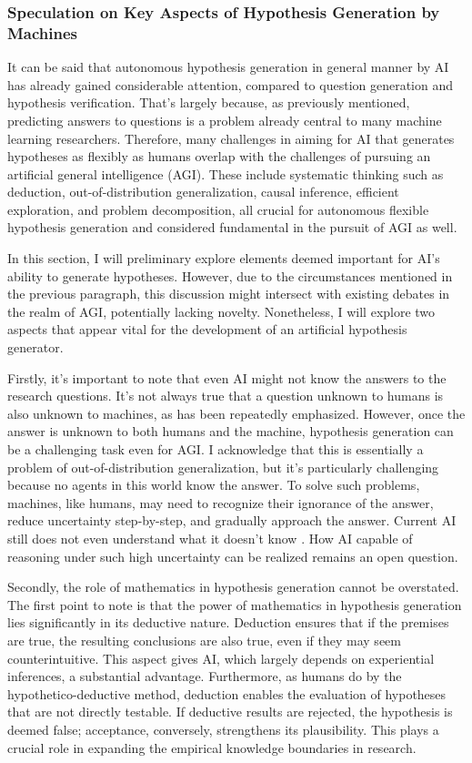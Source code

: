 \subsubsection{Speculation on Key Aspects of Hypothesis Generation by Machines}
It can be said that autonomous hypothesis generation in general manner by AI has already gained considerable attention, compared to question generation and hypothesis verification. That's largely because, as previously mentioned, predicting answers to questions is a problem already central to many machine learning researchers. Therefore, many challenges in aiming for AI that generates hypotheses as flexibly as humans overlap with the challenges of pursuing an artificial general intelligence (AGI). These include systematic thinking such as deduction, out-of-distribution generalization, causal inference, efficient exploration, and problem decomposition, all crucial for autonomous flexible hypothesis generation and considered fundamental in the pursuit of AGI as well.

In this section, I will preliminary explore elements deemed important for AI's ability to generate hypotheses. However, due to the circumstances mentioned in the previous paragraph, this discussion might intersect with existing debates in the realm of AGI, potentially lacking novelty. Nonetheless, I will explore two aspects that appear vital for the development of an artificial hypothesis generator.

Firstly, it's important to note that even AI might not know the answers to the research questions. It's not always true that a question unknown to humans is also unknown to machines, as has been repeatedly emphasized. However, once the answer is unknown to both humans and the machine, hypothesis generation can be a challenging task even for AGI. I acknowledge that this is essentially a problem of out-of-distribution generalization, but it's particularly challenging because no agents in this world know the answer. To solve such problems, machines, like humans, may need to recognize their ignorance of the answer, reduce uncertainty step-by-step, and gradually approach the answer. Current AI still does not even understand what it doesn't know \cite{guo2017calibration,maynez2020faithfulness}. How AI capable of reasoning under such high uncertainty can be realized remains an open question.

Secondly, the role of mathematics in hypothesis generation cannot be overstated. The first point to note is that the power of mathematics in hypothesis generation lies significantly in its deductive nature. Deduction ensures that if the premises are true, the resulting conclusions are also true, even if they may seem counterintuitive. This aspect gives AI, which largely depends on experiential inferences, a substantial advantage. Furthermore, as humans do by the hypothetico-deductive method, deduction enables the evaluation of hypotheses that are not directly testable. If deductive results are rejected, the hypothesis is deemed false; acceptance, conversely, strengthens its plausibility. This plays a crucial role in expanding the empirical knowledge boundaries in research. 


